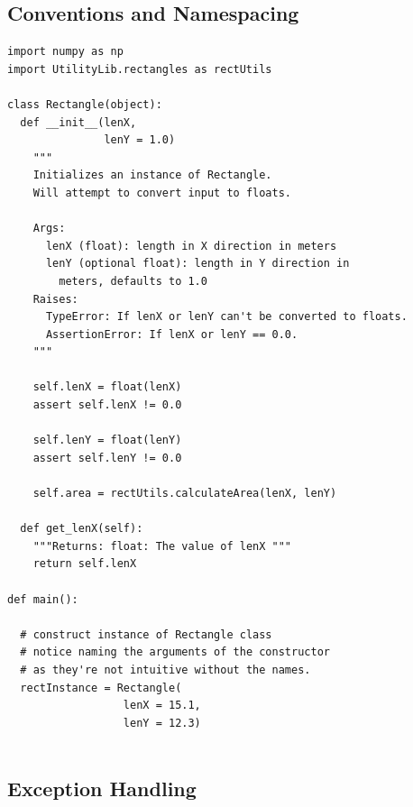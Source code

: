 \documentclass[10pt,a4paper]{article}
\begin{document}
\subsection{Conventions and Namespacing}
\begin{lstlisting}
import numpy as np
import UtilityLib.rectangles as rectUtils

class Rectangle(object):
  def __init__(lenX, 
               lenY = 1.0) 
    """
    Initializes an instance of Rectangle. 
    Will attempt to convert input to floats.
    
    Args: 
      lenX (float): length in X direction in meters
      lenY (optional float): length in Y direction in 
        meters, defaults to 1.0
    Raises:
      TypeError: If lenX or lenY can't be converted to floats.
      AssertionError: If lenX or lenY == 0.0.
    """
    
    self.lenX = float(lenX)
    assert self.lenX != 0.0
    
    self.lenY = float(lenY)
    assert self.lenY != 0.0

    self.area = rectUtils.calculateArea(lenX, lenY)

  def get_lenX(self):
    """Returns: float: The value of lenX """
    return self.lenX

def main():

  # construct instance of Rectangle class
  # notice naming the arguments of the constructor 
  # as they're not intuitive without the names.
  rectInstance = Rectangle(
                  lenX = 15.1, 
                  lenY = 12.3)
	
\end{lstlisting}

\newpage
\subsection{Exception Handling}
\end{document}
